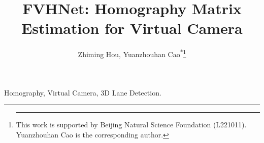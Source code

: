 \documentclass[conference]{IEEEtran}
\begin{document}
\title{FVHNet: Homography Matrix Estimation for Virtual Camera}
\author{Zhiming Hou, Yuanzhouhan Cao\textsuperscript{*}\thanks{\hrule \vspace{10pt} This work is supported by Beijing Natural Science Foundation (L221011). Yuanzhouhan Cao is the corresponding author.}}
\maketitle

\begin{abstract}
  
\end{abstract}
\begin{IEEEkeywords}
Homography, Virtual Camera, 3D Lane Detection.
\end{IEEEkeywords}











%



%
\end{document}
